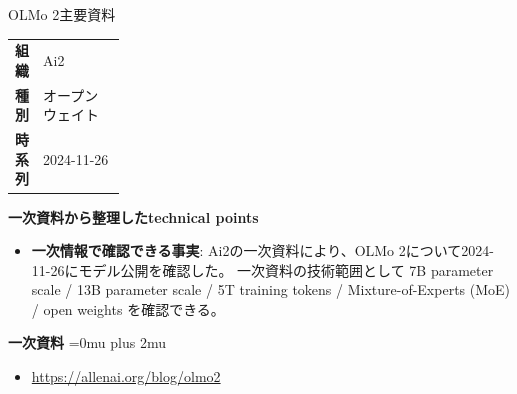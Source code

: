 \begin{technicalnote}{OLMo 2}{主要資料}
\begingroup
\begin{tabularx}{\linewidth}{@{}>{\bfseries}p{0.22\linewidth}X@{}}
組織 & Ai2 \\
種別 & オープンウェイト \\
時系列 & 2024-11-26 \\
\end{tabularx}
\smallskip
{\bfseries 一次資料から整理したtechnical points}
\begin{itemize}[leftmargin=1.5em,itemsep=0.35em]
\item \textbf{一次情報で確認できる事実}: Ai2の一次資料により、OLMo 2について2024-11-26にモデル公開を確認した。 一次資料の技術範囲として 7B parameter scale / 13B parameter scale / 5T training tokens / Mixture-of-Experts (MoE) / open weights を確認できる。
\end{itemize}
\begin{minipage}{\linewidth}
\begin{samepage}
{\bfseries 一次資料}
\begingroup\sloppy
\Urlmuskip=0mu plus 2mu\relax
\begin{itemize}[leftmargin=1.5em,itemsep=0.25em]
\item {\scriptsize\url{https://allenai.org/blog/olmo2}}
\end{itemize}
\endgroup
\end{samepage}
\end{minipage}
\endgroup
\end{technicalnote}
\medskip

